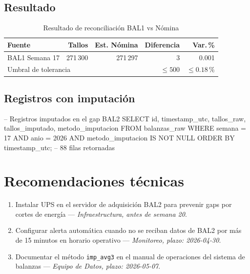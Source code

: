 \documentclass{../base/canon}
\begin{document}
\subsection{Resultado}

\begin{table}[H]
  \centering
  \caption{Resultado de reconciliación BAL1 vs Nómina}
  \begin{tabular}{l r r r r}
    \toprule
    \textbf{Fuente} & \textbf{Tallos} & \textbf{Est. Nómina} & \textbf{Diferencia} & \textbf{Var.\,\%} \\
    \midrule
    BAL1 Semana 17 & 271\,300 & 271\,297 & 3 & 0.001 \\
    \midrule
    \multicolumn{3}{l}{Umbral de tolerancia} & $\leq 500$ & $\leq 0.18\,\%$ \\
    \bottomrule
  \end{tabular}
\end{table}

\subsection{Registros con imputación}

\begin{CodeBlock}
-- Registros imputados en el gap BAL2
SELECT id, timestamp_utc, tallos_raw, tallos_imputado, metodo_imputacion
FROM balanzas_raw
WHERE semana = 17 AND anio = 2026
  AND metodo_imputacion IS NOT NULL
ORDER BY timestamp_utc;
-- 88 filas retornadas
\end{CodeBlock}

\section{Recomendaciones técnicas}

\begin{enumerate}
  \item Instalar UPS en el servidor de adquisición BAL2 para prevenir gaps por
        cortes de energía — \textit{Infraestructura, antes de semana 20}.
  \item Configurar alerta automática cuando no se reciban datos de BAL2 por más
        de 15 minutos en horario operativo — \textit{Monitoreo, plazo: 2026-04-30}.
  \item Documentar el método \texttt{imp\_avg3} en el manual de operaciones del
        sistema de balanzas — \textit{Equipo de Datos, plazo: 2026-05-07}.
\end{enumerate}


\ContactSignature
\end{document}
